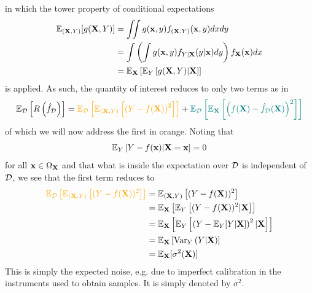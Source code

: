 \documentclass[11pt]{article}
\begin{document}
in which the tower property of conditional expectations
\begin{align*}
    \mathbb{E}_{(\mathbf{X},Y)}[g(\mathbf{X},Y)]
    &=
    \iint g(\mathbf{x},y)f_{(\mathbf{X},Y)}(\mathbf{x},y)dxdy\\
    &=
    \int \left(\int g(\mathbf{x},y)f_{Y|\mathbf{X}}(y|\mathbf{x})dy\right)f_{\mathbf{X}}(\mathbf{x})dx\\
    &=
    \mathbb{E}_{\mathbf{X}}\left[\mathbb{E}_{Y}\left[g(\mathbf{X},Y)|\mathbf{X}\right]\right]
\end{align*}
is applied. As such, the quantity of interest reduces to only two terms as in
$$
\E_{\D}\l[R\l(\hat{f}_{\D}\r)\r]
=
\textcolor{myYellow}{\E_{\D}\l[\E_{(\X,Y)}\l[\l(Y-f(\X)\r)^2\r]\r]}+\textcolor{myGreen}{\E_{\D}\l[\E_\X\l[\l(f(\X)-\hat{f}_{\D}(\X)\r)^2\r]\r]}
$$
of which we will now address the first in orange. Noting that
$$
\mathbb{E}_{Y}\left[Y-f(\mathbf{x})|\mathbf{X}=\mathbf{x}\right]
=
0
$$
for all $\mathbf{x}\in\Omega_{\mathbf{X}}$ and that what is inside the expectation over $\mathcal{D}$ is independent of $\mathcal{D}$, we see that the first term reduces to
\begin{align*}
    \textcolor{myYellow}{\E_{\D}\l[\E_{(\X,Y)}\l[(Y-f(\X))^2\r]\r]}
    &=
    \E_{(\X,Y)}\l[(Y-f(\X))^2\r]\\
    &=
    \E_\X\l[\E_{Y}\l[(Y-f(\X))^2|\X\r]\r]\\
    &=
    \E_\X\l[\E_{Y}\l[\l(Y-\E_Y[Y|\X]\r)^2|\X\r]\r]\\
    &=
    \E_\X\l[\text{Var}_Y\l(Y|\X\r)\r]\\
    &=
    \E_\X[\sigma^2(\X)]
\end{align*}
This is simply the expected noise, e.g. due to imperfect calibration in the instruments used to obtain samples. It is simply denoted by $\sigma^2$.
\end{document}
